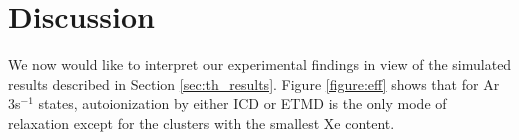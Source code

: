 \section{Discussion
\label{sec:discussion}}
%
%
%
%
%
%
We now would like to interpret our experimental findings in view of the simulated results described in Section \ref{sec:th_results}.
Figure \ref{figure:eff} shows that for Ar 3s$^{-1}$ states, autoionization by either ICD or ETMD is the only mode of relaxation except for the clusters with the smallest Xe content.
